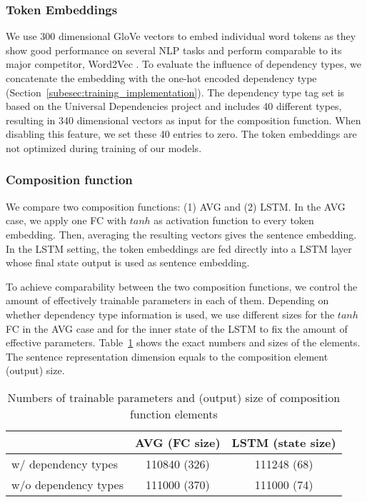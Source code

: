 \subsubsection{Token Embeddings}
We use 300 dimensional  GloVe vectors \autocite{pennington_glove_2014} to embed individual word tokens as they show good performance on several \ac{NLP} tasks and perform comparable to its major competitor, Word2Vec \autocite{levy_improving_2015,naili_comparative_2017}. To evaluate the influence of dependency types, we concatenate the embedding with the one-hot encoded dependency type (Section~\ref{subesec:training_implementation}). The dependency type tag set is based on the Universal Dependencies project \autocite{nivre_universal_2016} and includes 40 different types, resulting in 340 dimensional vectors as input for the composition function. When disabling this feature, we set these 40 entries to zero. The token embeddings are not optimized during training of our models.   

\subsubsection{Composition function}
We compare two composition functions: (1) \acf{AVG} and (2) \acf{LSTM}. 
In the \ac{AVG} case, we apply one \acf{FC} with $tanh$ as activation function to every token embedding. Then, averaging the resulting vectors gives the sentence embedding.
In the \ac{LSTM} setting, the token embeddings are fed directly into a LSTM layer whose final state  output is used as sentence embedding. %

To achieve comparability between the two composition functions, we control the amount of effectively trainable parameters in each of them. Depending on whether dependency type information is used, we use different sizes for the $tanh$ \ac{FC} in the \ac{AVG} case and for the inner state of the \ac{LSTM} to fix the amount of effective parameters. Table~\ref{tab:sizes} shows the exact numbers and sizes of the elements. The sentence representation dimension equals to the composition element (output) size.  %

\begin{table}[!htb]
  \centering
  \begin{tabular}{ l | c | c }
      & AVG (FC size) & LSTM (state size) \\ \hline
    w/ dependency types & 110840 (326) & 111248 (68) \\ 
    w/o dependency types & 111000 (370) & 111000 (74) \\
  \end{tabular}
  \caption{Numbers of trainable parameters and (output) size of composition function elements}
  \label{tab:sizes}
\end{table}

